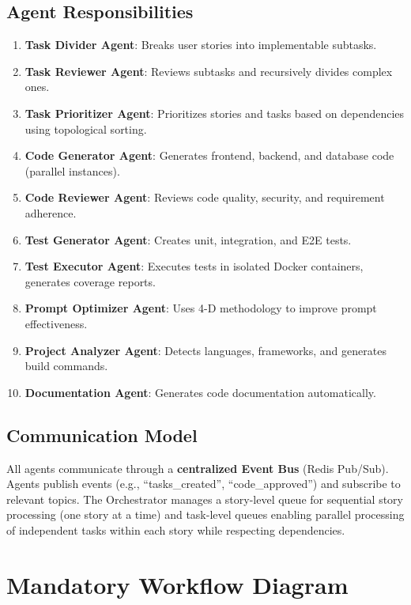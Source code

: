 \documentclass[11pt,a4paper]{article}
\begin{document}
\subsection{Agent Responsibilities}

\begin{enumerate}
  \item \textbf{Task Divider Agent}: Breaks user stories into implementable subtasks.
  \item \textbf{Task Reviewer Agent}: Reviews subtasks and recursively divides complex ones.
  \item \textbf{Task Prioritizer Agent}: Prioritizes stories and tasks based on dependencies using topological sorting.
  \item \textbf{Code Generator Agent}: Generates frontend, backend, and database code (parallel instances).
  \item \textbf{Code Reviewer Agent}: Reviews code quality, security, and requirement adherence.
  \item \textbf{Test Generator Agent}: Creates unit, integration, and E2E tests.
  \item \textbf{Test Executor Agent}: Executes tests in isolated Docker containers, generates coverage reports.
  \item \textbf{Prompt Optimizer Agent}: Uses 4-D methodology to improve prompt effectiveness.
  \item \textbf{Project Analyzer Agent}: Detects languages, frameworks, and generates build commands.
  \item \textbf{Documentation Agent}: Generates code documentation automatically.
\end{enumerate}

\subsection{Communication Model}

All agents communicate through a \textbf{centralized Event Bus} (Redis Pub/Sub). Agents publish events (e.g., ``tasks\_created'', ``code\_approved'') and subscribe to relevant topics. The Orchestrator manages a story-level queue for sequential story processing (one story at a time) and task-level queues enabling parallel processing of independent tasks within each story while respecting dependencies.
\vspace*{-0.1cm}

\section{Mandatory Workflow Diagram}
\end{document}
